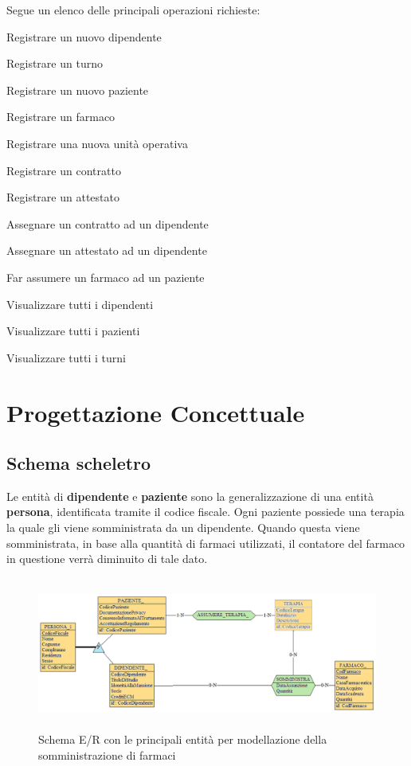 \documentclass[a4paper, 12pt]{report}
\newenvironment{packed_enum}{
\begin{enumerate}
        \setlength{\itemsep}{1pt}
        \setlength{\parskip}{0pt}
        \setlength{\parsep}{0pt}
}{\end{enumerate}}
\begin{document}
Segue un elenco delle principali operazioni richieste:
\begin{packed_enum}
        \item Registrare un nuovo dipendente
        \item Registrare un turno
        \item Registrare un nuovo paziente
        \item Registrare un farmaco
        \item Registrare una nuova unità operativa
        \item Registrare un contratto
        \item Registrare un attestato
        \item Assegnare un contratto ad un dipendente
        \item Assegnare un attestato ad un dipendente
        \item Far assumere un farmaco ad un paziente
        \item Visualizzare tutti i dipendenti
        \item Visualizzare tutti i pazienti
        \item Visualizzare tutti i turni
\end{packed_enum}

\chapter{Progettazione Concettuale}

\section{Schema scheletro}

\noindent
Le entità di \textbf{dipendente} e \textbf{paziente} sono la generalizzazione di una entità \textbf{persona}, identificata
tramite il codice fiscale. Ogni paziente possiede una terapia la quale gli viene somministrata da un dipendente.
Quando questa viene somministrata, in base alla quantità di farmaci utilizzati, il contatore del farmaco in questione verrà
diminuito di tale dato.

\begin{figure}[H]
        \centering
        \includegraphics[height=5cm]{img/dipendentePazienteERPostReif.png}
        \caption{Schema E/R con le principali entità per modellazione della somministrazione di farmaci}
\end{figure}
\end{document}
